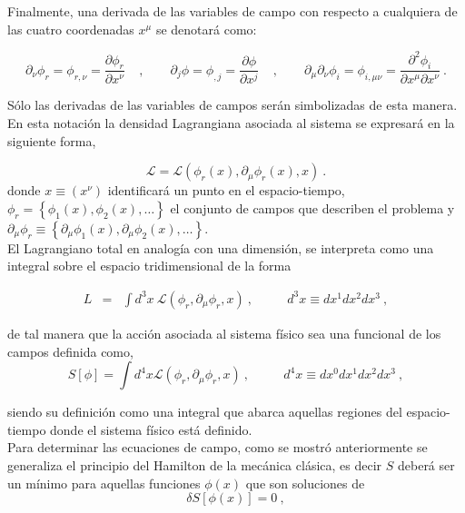 \noindent
Finalmente, una derivada de las variables de campo con respecto a cualquiera de las cuatro coordenadas $x^{\mu}$ se denotar\'{a} como:

\begin{equation*}
\partial _{\nu }\phi _{r}=\phi_{r,\nu }=\frac{\partial \phi _{r}}{\partial x^{\nu }}~\ ~\ \ ,\qquad \partial _{j}\phi =\phi _{,j}=\frac{\partial \phi }{\partial x^{j}}~\ \ \ ~,\qquad \partial _{\mu}\partial_{\nu }\phi _{i}=\phi_{i,\mu \nu }=\frac{\partial ^{2}\phi_{i}}{\partial x^{\mu }\partial x^{\nu }}~.
\end{equation*}

\noindent
S\'{o}lo las derivadas de las variables de campos ser\'{a}n simbolizadas de
esta manera. En esta notaci\'{o}n la densidad Lagrangiana asociada al sistema se expresará en la siguiente forma,

\begin{equation}
\mathcal{L}=\mathcal{L}\left( \phi_{r}(x),\partial_{\mu}\phi_{r}(x),x\right)~.  \label{2.17t}
\end{equation}
donde $x\equiv (x^{\nu})$ identificará un punto en el espacio-tiempo, $\phi_{r}=\left\{\phi_{1}(x),\phi_{2}(x),\ldots \right\}$ el conjunto de campos que describen el problema y $\partial_{\mu}\phi_{r} \equiv \left\{\partial_{\mu}\phi_{1}(x),\partial_{\mu}\phi_{2}(x),\ldots \right\}$.\\

\noindent
El Lagrangiano total en analogía con una dimensión, se interpreta como una integral sobre el espacio tridimensional de la forma

\begin{eqnarray}
L &=&\int d^{3}x\ \mathcal{L}\left( \phi_{r},\partial _{\mu }\phi_{r},x\right)~, \qquad ~~~d^{3}x\equiv dx^{1}dx^{2}dx^{3}~,  \label{2.17u}
\end{eqnarray}

\noindent
de tal manera que la acción asociada al sistema físico sea una funcional de los campos definida como,
\begin{equation}
    S[\phi]=\int d^{4}x \mathcal{L}\left( \phi _{r},\partial _{\mu }\phi_{r},x\right)~, \qquad ~~~d^{4}x\equiv dx^{0}dx^{1}dx^{2}dx^{3}~,
\end{equation}

\noindent
siendo su definición como una integral que abarca aquellas regiones del espacio-tiempo donde el sistema físico está definido.\\

\noindent
Para determinar las ecuaciones de campo, como se mostró anteriormente se generaliza el principio del Hamilton de la mecánica clásica, es decir $S$ deberá ser un mínimo para aquellas funciones $\phi(x)$ que son soluciones de
\begin{equation}
    \delta S[\phi(x)]=0~,
\end{equation}

